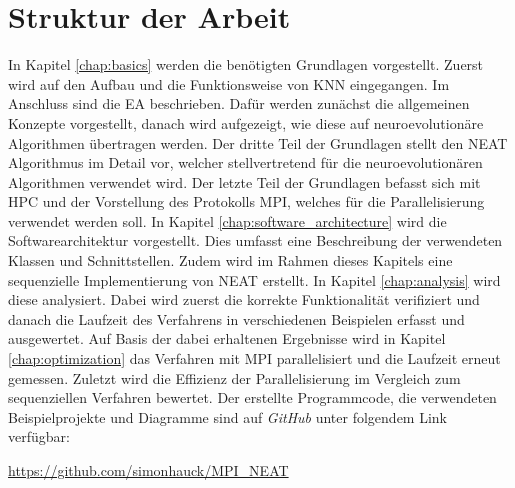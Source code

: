 \section{Struktur der Arbeit}
In Kapitel \ref{chap:basics} werden die benötigten Grundlagen vorgestellt. Zuerst wird auf den Aufbau und die Funktionsweise von \ac{KNN} eingegangen. Im Anschluss sind die \ac{EA} beschrieben. Dafür werden zunächst die allgemeinen Konzepte vorgestellt, danach wird aufgezeigt, wie diese auf neuroevolutionäre Algorithmen übertragen werden. Der dritte Teil der Grundlagen stellt den \ac{NEAT} Algorithmus im Detail vor, welcher stellvertretend für die neuroevolutionären Algorithmen verwendet wird. Der letzte Teil der Grundlagen befasst sich mit \ac{HPC} und der Vorstellung des Protokolls \ac{MPI}, welches für die Parallelisierung verwendet werden soll. In Kapitel \ref{chap:software_architecture} wird die Softwarearchitektur vorgestellt. Dies umfasst eine Beschreibung der verwendeten Klassen und Schnittstellen. Zudem wird im Rahmen dieses Kapitels eine sequenzielle Implementierung von \ac{NEAT} erstellt. In Kapitel \ref{chap:analysis} wird diese analysiert. Dabei wird zuerst die korrekte Funktionalität verifiziert und danach die Laufzeit des Verfahrens in verschiedenen Beispielen erfasst und ausgewertet. Auf Basis der dabei erhaltenen Ergebnisse wird in Kapitel \ref{chap:optimization} das Verfahren mit \ac{MPI} parallelisiert und die Laufzeit erneut gemessen. Zuletzt wird die Effizienz der Parallelisierung im Vergleich zum sequenziellen Verfahren bewertet. Der erstellte Programmcode, die verwendeten Beispielprojekte und Diagramme sind auf \emph{GitHub} unter folgendem Link verfügbar:
\begin{center}
	\url{https://github.com/simonhauck/MPI_NEAT}
\end{center}



\acresetall